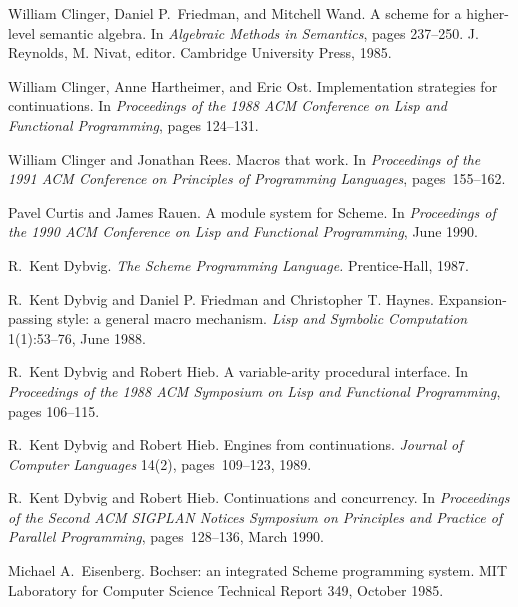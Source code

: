 \begin{thebibliography}{999}
William Clinger, Daniel P.~Friedman, and Mitchell Wand.
A scheme for a higher-level semantic algebra.
In {\em Algebraic Methods in Semantics}, pages 237--250.
J. Reynolds, M. Nivat, editor.
Cambridge University Press, 1985.

William Clinger, Anne Hartheimer, and Eric Ost.
Implementation strategies for continuations.
In {\em Proceedings of the 1988 ACM Conference on Lisp and Functional
  Programming}, pages 124--131.

William Clinger and Jonathan Rees.
Macros that work.
In {\em Proceedings of the 1991 ACM Conference on Principles of
  Programming Languages}, pages~155--162.

Pavel Curtis and James Rauen.
A module system for Scheme.
In {\em Proceedings of the 1990 ACM Conference on Lisp and
  Functional Programming}, June 1990.

R.~Kent Dybvig.
{\em The Scheme Programming Language.}
Prentice-Hall, 1987.


R.~Kent Dybvig and Daniel P. Friedman and Christopher T. Haynes.
Expansion-passing style: a general macro mechanism.
{\em Lisp and Symbolic Computation} 1(1):53--76, June 1988.

R.~Kent Dybvig and Robert Hieb.
A variable-arity procedural interface.
In {\em Proceedings of the 1988 ACM Symposium on Lisp and
  Functional Programming}, pages 106--115.

R.~Kent Dybvig and Robert Hieb.
Engines from continuations.
{\em Journal of Computer Languages} 14(2), pages~109--123,
1989.

R.~Kent Dybvig and Robert Hieb.
Continuations and concurrency.
In {\em Proceedings of the Second ACM SIGPLAN Notices
  Symposium on Principles and Practice of Parallel Programming},
pages~128--136, March 1990.


Michael A.~Eisenberg.
Bochser: an integrated Scheme programming system.
MIT Laboratory for Computer Science Technical Report 349,
  October 1985.


\end{thebibliography}
